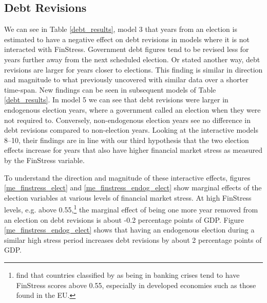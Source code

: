 \documentclass[]{article}
\begin{document}
\subsection{Debt Revisions}

We can see in Table \ref{debt_results}, model 3 that years from an election is estimated to have a negative effect on debt revisions in models where it is not interacted with FinStress. Government debt figures tend to be revised less for years further away from the next scheduled election. Or stated another way, debt revisions are larger for years closer to elections. This finding is similar in direction and magnitude to what \cite{DeCastro2013} previously uncovered with similar data over a shorter time-span. New findings can be seen in subsequent models of Table \ref{debt_results}. In model 5 we can see that debt revisions were larger in endogenous election years, where a government called an election when they were not required to. Conversely, non-endogenous election years see no difference in debt revisions compared to non-election years. Looking at the interactive models 8--10, their findings are in line with our third hypothesis that the two election effects increase for years that also have higher financial market stress as measured by the FinStress variable.

To understand the direction and magnitude of these interactive effects, figures \ref{me_finstress_elect} and \ref{me_finstress_endog_elect} show marginal effects of the election variables at various levels of financial market stress. At high FinStress levels, e.g. above 0.55,\footnote{\cite{finstress_paper} find that countries classified by \cite{Laeven2012} as being in banking crises tend to have FinStress scores above 0.55, especially in developed economies such as those found in the EU.} the marginal effect of being one more year removed from an election on debt revisions is about -0.2 percentage points of GDP. Figure \ref{me_finstress_endog_elect} shows that having an endogenous election during a similar high stress period increases debt revisions by about 2 percentage points of GDP.
\end{document}

